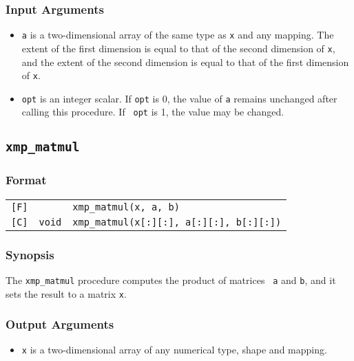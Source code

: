 \subsubsection*{Input Arguments}
\begin{itemize}
 \item {\tt a} is a two-dimensional array of the same type as {\tt x}
       and any mapping. The extent of the first dimension is equal to
       that of the second dimension of {\tt x}, and the extent of the
       second dimension is equal to that of the first dimension of
       {\tt x}.
 \item {\tt opt} is an integer scalar. If {\tt opt} is 0, the value of
       {\tt a} remains unchanged after calling this procedure. If {\tt
       opt} is 1, the value may be changed.
\end{itemize}


\subsection{\tt xmp\_matmul}

\subsubsection*{Format}

\begin{tabular}{lll}

\verb![F]!&            & {\tt xmp\_matmul(x, a, b)}\\

\verb![C]!& {\tt void} & {\tt xmp\_matmul(x[:][:], a[:][:], b[:][:])}\\

\end{tabular}

\subsubsection*{Synopsis}

The {\tt xmp\_matmul} procedure computes the product of matrices {\tt
a} and {\tt b}, and it sets the result to a matrix {\tt x}.

\subsubsection*{Output Arguments}
\begin{itemize}
 \item {\tt x} is a two-dimensional array of any numerical type, shape
       and mapping.
\end{itemize}

